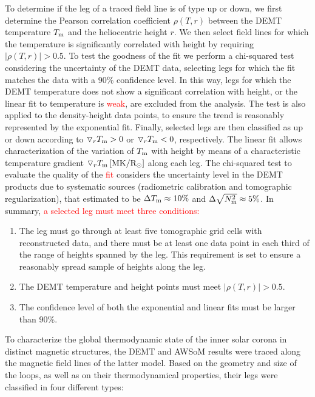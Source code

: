 \documentclass[namedreferences]{solarphysics}
\def\edit#1{\textcolor{Red}{#1}}
\newcommand{\mrsun}{{\rm R_\odot}}
\newcommand{\MK}{{\rm MK}}
\newcommand{\dr}{\triangledown_r}
\newcommand{\Tm}{T_{\rm m}}
\newcommand{\Nsqm}{N^2_{{\rm m}}}
\newcommand{\rhoTr}{\rho(T,r)}
\newcommand{\sqravgN}{\sqrt{\Nsqm}}
\begin{document}
\begin{article}
{To determine if the leg of a traced field line is} of type up or down, we first determine the Pearson correlation coefficient $\rhoTr$ between the DEMT temperature $\Tm$ and the heliocentric height $r$. We then select field lines for which the temperature {is significantly correlated with height} by requiring $|\rhoTr| > 0.5$. {To test the goodness of the fit we perform a chi-squared test \citep{recipes} considering the uncertainty of the DEMT data, selecting legs for which the fit matches the data with a 90\% confidence level.} In this way, legs for which the DEMT temperature does not show a significant {correlation} with height, or the linear fit to temperature is \edit{weak}, are {excluded from the} analysis. {The test is also applied to the density-height data points, to ensure the trend is reasonably represented by the exponential fit.} Finally, selected legs are then classified as up or down according to $\dr\Tm > 0$ or $\dr\Tm < 0$, respectively. The linear fit allows characterization of the variation of $\Tm$ with height by means of a characteristic temperature gradient $\dr \Tm\,[\MK/\mrsun]$ along each leg. {The chi-squared test to evaluate the quality of the \edit{fit} considers the uncertainty level in the DEMT products due to systematic sources (radiometric calibration and tomographic regularization), that \citet{lloveras_2017} estimated to be $\Delta\Tm\approx 10\%$ and $\Delta\sqravgN\approx 5\%$.} In summary, \edit{a selected leg must meet three conditions:}

\begin{enumerate}
\item 
The leg must go through at least five tomographic grid cells with reconstructed data, and there must be at least one data point in each third of the range of heights spanned by the leg. {This requirement is set to ensure a reasonably spread sample of heights along the leg.}
\item 
The {DEMT temperature and height points must meet} $|\rhoTr| > 0.5$.
\item 
{The confidence level of both the exponential and linear fits must be larger than 90\%.} 
\end{enumerate}

{To characterize the global thermodynamic state of the inner solar corona in distinct magnetic structures, the DEMT and AWSoM results were traced along the magnetic field lines of the latter model. Based on the geometry and size of the loops, as well as on their thermodynamical properties, their legs were classified in four different types:} 


\end{article}
\end{document}
